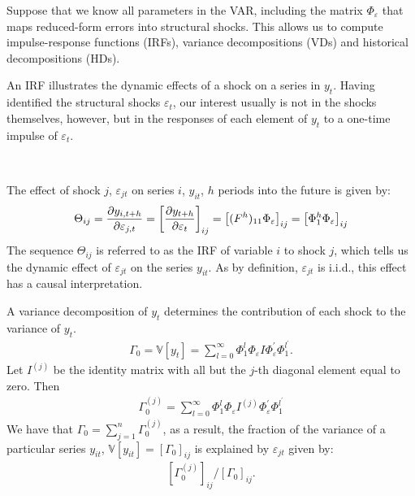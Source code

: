 Suppose that we know all parameters in the VAR, including the matrix $\Phi_{\varepsilon}$ that maps reduced-form errors into structural shocks.
This allows us to compute impulse-response functions (IRFs), variance decompositions (VDs) and historical decompositions (HDs).

An IRF illustrates the dynamic effects of a shock on a series in $y_t$.
Having identified the structural shocks $\varepsilon_t$, our interest usually is not in the shocks themselves,
however, but in the responses of each element of $y_t$ to a one-time impulse of $\varepsilon_t$.
\begin{definition}\label{def:IRF}
    \

    The effect of shock $j$, $\varepsilon_{jt}$ on series $i$, $y_{it}$, $h$ periods into the future is given by:
    \begin{gather}\label{eq:IRF}
        \Theta_{ij} = \frac{\partial y_{i, t+h}}{\partial \varepsilon_{j, t}} = \left[ \frac{\partial y_{t+h}}{\partial \varepsilon_t} \right]_{ij} = \left[(F^h)_{11} \Phi_{\varepsilon}\right]_{ij} = \left[\Phi_1^h \Phi_{\varepsilon}\right]_{ij}
    \end{gather}
    The sequence $\Theta_{ij}$ is referred to as the IRF of variable $i$ to shock $j$,
    which tells us the dynamic effect of $\varepsilon_{jt}$ on the series $y_{it}.$
    As by definition, $\varepsilon_{jt}$ is i.i.d., this effect has a causal interpretation.
\end{definition}

A variance decomposition of $y_t$ determines the contribution of each shock to the variance of $y_t$.
\begin{gather*}
    \Gamma_0 = \mathbb{V}[y_t] = \sum_{l=0}^{\infty} \Phi_1^l \Phi_\varepsilon I \Phi_\varepsilon^{\prime} \Phi_1^{l^\prime}.
\end{gather*}
Let $I^{(j)}$ be the identity matrix with all but the $j$-th diagonal element equal to zero. Then
\begin{gather*}
    \Gamma_0^{(j)} = \sum_{l=0}^{\infty} \Phi_1^l \Phi_\varepsilon I^{(j)} \Phi_\varepsilon^{\prime} \Phi_1^{l^\prime}
\end{gather*}
We have that $\Gamma_0 = \sum_{j=1}^{n} \Gamma_0^{(j)}$, as a result,
the fraction of the variance of a particular series $y_{it}$, $\mathbb{V}[y_{it}] = \left[\Gamma_0\right]_{ij}$ is explained by $\varepsilon_{jt}$ given by:
\begin{gather*}
    \left[\Gamma_0^{(j)}\right]_{ij} / \left[\Gamma_0\right]_{ij}.
\end{gather*}

